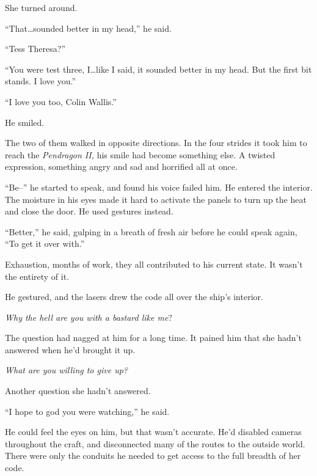 She turned around.



``That\ldots sounded better in my head,'' he said.



``Tess Theresa?''



``You were test three, I\ldots like I said, it sounded better in my head.  But the first bit stands.  I love you.''



``I love you too, Colin Wallis.''



He smiled.



The two of them walked in opposite directions.  In the four strides it took him to reach the \emph{Pendragon II, }his smile had become something else.  A twisted expression, something angry and sad and horrified all at once.



``Be--'' he started to speak, and found his voice failed him.  He entered the interior.  The moisture in his eyes made it hard to activate the panels to turn up the heat and close the door.  He used gestures instead.



``Better,'' he said, gulping in a breath of fresh air before he could speak again, ``To get it over with.''



Exhaustion, months of work, they all contributed to his current state.  It wasn't the entirety of it.



He gestured, and the lasers drew the code all over the ship's interior.



\emph{Why the hell are you with a bastard like me}?



The question had nagged at him for a long time.  It pained him that she hadn't answered when he'd brought it up.



\emph{What are you willing to give up?}



Another question she hadn't answered.



``I hope to god you were watching,'' he said.



He could feel the eyes on him, but that wasn't accurate.  He'd disabled cameras throughout the craft, and disconnected many of the routes to the outside world.  There were only the conduits he needed to get access to the full breadth of her code.



